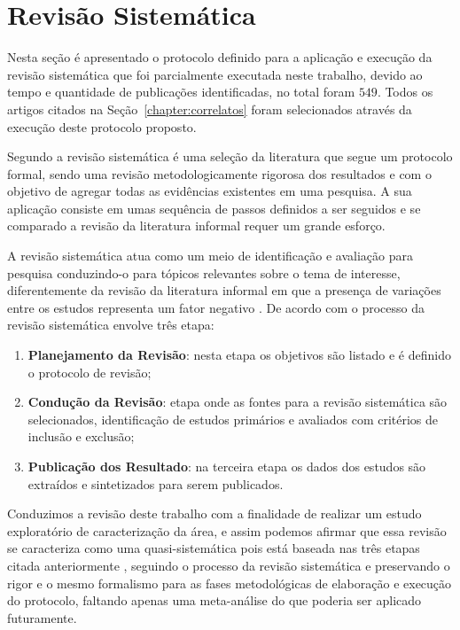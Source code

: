 \section{Revisão Sistemática}

Nesta seção é apresentado o protocolo definido para a aplicação e execução da revisão sistemática que foi parcialmente executada
neste trabalho, devido ao tempo e quantidade de publicações identificadas, no total foram $549$. Todos os artigos citados na
Seção~\ref{chapter:correlatos} foram selecionados através da execução deste protocolo proposto.

            Segundo   a revisão sistemática é uma seleção da literatura que segue um protocolo formal, sendo uma revisão metodologicamente rigorosa dos resultados e com o objetivo de agregar todas as evidências existentes em uma pesquisa. A sua aplicação consiste em umas sequência de passos definidos a ser seguidos e se comparado a revisão da literatura informal requer um grande esforço.
            
            \par
            A revisão sistemática atua como um meio de identificação  e avaliação para pesquisa conduzindo-o para tópicos relevantes sobre o tema de interesse, diferentemente da revisão da literatura informal em que a presença de variações entre os estudos representa um fator negativo
            \cite{MafraTravassos}.
            De acordo com  o processo da revisão sistemática envolve três etapa:
            \begin{enumerate}
                \item \textbf{Planejamento da Revisão}: nesta etapa os objetivos são listado e é definido o protocolo de revisão;
                \item \textbf{Condução da Revisão}: etapa onde as fontes para a revisão sistemática são selecionados, identificação de estudos primários e avaliados com critérios de inclusão e exclusão;
                \item \textbf{Publicação dos Resultado}: na terceira etapa os dados dos estudos são extraídos e sintetizados para serem publicados.
            \end{enumerate}
            
            \par
            Conduzimos a revisão deste trabalho com a finalidade de realizar um estudo exploratório de caracterização da área, e assim podemos afirmar que essa revisão se caracteriza como uma quasi-sistemática pois está baseada nas três etapas citada anteriormente \cite{MafraTravassos}, seguindo o processo da revisão sistemática e preservando o rigor e o mesmo formalismo para as fases metodológicas de elaboração e execução do protocolo, faltando apenas uma meta-análise do que poderia ser aplicado futuramente.
            

